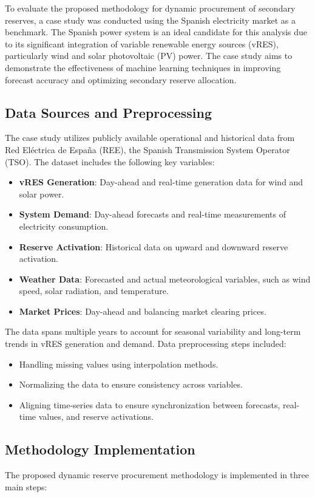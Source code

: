 To evaluate the proposed methodology for dynamic procurement of secondary reserves, a case study was conducted using the Spanish electricity market as a benchmark. The Spanish power system is an ideal candidate for this analysis due to its significant integration of variable renewable energy sources (vRES), particularly wind and solar photovoltaic (PV) power. The case study aims to demonstrate the effectiveness of machine learning techniques in improving forecast accuracy and optimizing secondary reserve allocation.\par
\subsection{Data Sources and Preprocessing}

The case study utilizes publicly available operational and historical data from Red Eléctrica de España (REE), the Spanish Transmission System Operator (TSO). The dataset includes the following key variables:
\begin{itemize}
    \item \textbf{vRES Generation}: Day-ahead and real-time generation data for wind and solar power.
    \item \textbf{System Demand}: Day-ahead forecasts and real-time measurements of electricity consumption.
    \item \textbf{Reserve Activation}: Historical data on upward and downward reserve activation.
    \item \textbf{Weather Data}: Forecasted and actual meteorological variables, such as wind speed, solar radiation, and temperature.
    \item \textbf{Market Prices}: Day-ahead and balancing market clearing prices.
\end{itemize}


The data spans multiple years to account for seasonal variability and long-term trends in vRES generation and demand. Data preprocessing steps included:
\begin{itemize}
    \item Handling missing values using interpolation methods.
    \item Normalizing the data to ensure consistency across variables.
    \item Aligning time-series data to ensure synchronization between forecasts, real-time values, and reserve activations.
\end{itemize}

\subsection*{Methodology Implementation}
The proposed dynamic reserve procurement methodology is implemented in three main steps:

